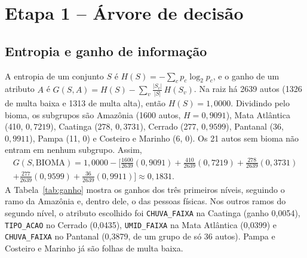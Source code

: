 \documentclass[11pt]{article}
\begin{document}
\section{Etapa 1 -- Árvore de decisão}

\subsection{Entropia e ganho de informação}
A entropia de um conjunto $S$ é $H(S) = -\sum_c p_c \log_2 p_c$, e o ganho de um atributo $A$ é $G(S,A) = H(S) - \sum_v \frac{|S_v|}{|S|}\,H(S_v)$. Na raiz há 2639 autos (1326 de multa baixa e 1313 de multa alta), então $H(S) = 1{,}0000$. Dividindo pelo bioma, os subgrupos são Amazônia (1600 autos, $H = 0{,}9091$), Mata Atlântica (410, $0{,}7219$), Caatinga (278, $0{,}3731$), Cerrado (277, $0{,}9599$), Pantanal (36, $0{,}9911$), Pampa (11, $0$) e Costeiro e Marinho (6, $0$). Os 21 autos sem bioma não entram em nenhum subgrupo. Assim,
\begin{multline*}
G(S,\text{BIOMA}) = 1{,}0000 - \Big[\tfrac{1600}{2639}(0{,}9091) + \tfrac{410}{2639}(0{,}7219) + \tfrac{278}{2639}(0{,}3731) \\
+ \tfrac{277}{2639}(0{,}9599) + \tfrac{36}{2639}(0{,}9911)\Big] \approx 0{,}1831 .
\end{multline*}
A Tabela~\ref{tab:ganho} mostra os ganhos dos três primeiros níveis, seguindo o ramo da Amazônia e, dentro dele, o das pessoas físicas. Nos outros ramos do segundo nível, o atributo escolhido foi \texttt{CHUVA\_FAIXA} na Caatinga (ganho 0,0054), \texttt{TIPO\_ACAO} no Cerrado (0,0435), \texttt{UMID\_FAIXA} na Mata Atlântica (0,0399) e \texttt{CHUVA\_FAIXA} no Pantanal (0,3879, de um grupo de só 36 autos). Pampa e Costeiro e Marinho já são folhas de multa baixa.
\end{document}

